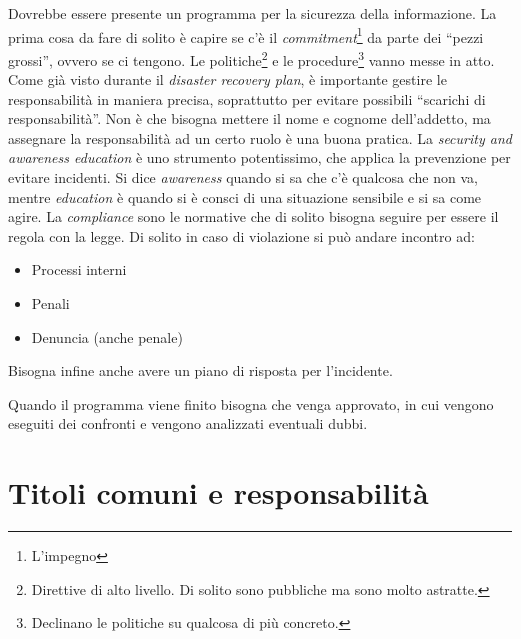 Dovrebbe essere presente un programma per la sicurezza della informazione. La 
prima cosa da fare di solito è capire se c'è il 
\textit{commitment}\footnote{L'impegno} da parte dei ``pezzi grossi'', ovvero 
se ci tengono. Le politiche\footnote{Direttive di alto livello. Di solito sono 
pubbliche ma sono molto astratte.} e le procedure\footnote{Declinano le 
politiche su qualcosa di più concreto.} vanno messe in atto. Come già visto 
durante il \textit{disaster recovery plan}, è importante gestire le 
responsabilità in maniera precisa, soprattutto per evitare possibili ``scarichi 
di responsabilità''. Non è che bisogna mettere il nome e cognome dell'addetto, 
ma assegnare la responsabilità ad un certo ruolo è una buona pratica. La 
\textit{security and awareness education} è uno strumento potentissimo, che 
applica la prevenzione per evitare incidenti. Si dice \textit{awareness} quando 
si sa che c'è qualcosa che non va, mentre \textit{education} è quando si è 
consci di una situazione sensibile e si sa come agire.
La \textit{compliance} sono le normative che di solito bisogna seguire per 
essere il regola con la legge. Di solito in caso di violazione si può andare 
incontro ad:
\begin{itemize}
  \item Processi interni
  \item Penali
  \item Denuncia (anche penale)
\end{itemize}
Bisogna infine anche avere un piano di risposta per l'incidente.

Quando il programma viene finito bisogna che venga approvato, in cui vengono 
eseguiti dei confronti e vengono analizzati eventuali dubbi.

\section{Titoli comuni e responsabilità}


